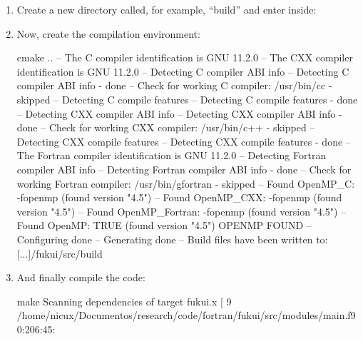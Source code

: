 \documentclass[a4paper,11pt,openany]{memoir}
\begin{document}
\begin{enumerate}
\begin{consola}{vim CMakeLists.txt}
set(CMAKE\_Fortran\_COMPILER gfortran)
#set(CMAKE\_Fortran\_COMPILER ifort)
set(CMAKE\_GENERATOR\_FC gfortran)
#set(CMAKE\_GENERATOR\_FC ifort)
## Comment the line in which ``gfortran'' is set and uncomment the corresponding lines
## using ``ifort'':
## >> DEFAULT COMPILER << \#\# Force compiler you want
#set(CMAKE\_Fortran\_COMPILER gfortran)
set(CMAKE\_Fortran\_COMPILER ifort)
#set(CMAKE\_GENERATOR\_FC gfortran)
set(CMAKE\_GENERATOR\_FC ifort)
\end{consola}
	\item Create a new directory called, for example, ``build'' and enter inside:
	\item Now, create the compilation environment:
		\begin{consola}{cmake ..}
-- The C compiler identification is GNU 11.2.0
-- The CXX compiler identification is GNU 11.2.0
-- Detecting C compiler ABI info
-- Detecting C compiler ABI info - done
-- Check for working C compiler: /usr/bin/cc - skipped
-- Detecting C compile features
-- Detecting C compile features - done
-- Detecting CXX compiler ABI info
-- Detecting CXX compiler ABI info - done
-- Check for working CXX compiler: /usr/bin/c++ - skipped
-- Detecting CXX compile features
-- Detecting CXX compile features - done
-- The Fortran compiler identification is GNU 11.2.0
-- Detecting Fortran compiler ABI info
-- Detecting Fortran compiler ABI info - done
-- Check for working Fortran compiler: /usr/bin/gfortran - skipped
-- Found OpenMP_C: -fopenmp (found version "4.5")
-- Found OpenMP_CXX: -fopenmp (found version "4.5")
-- Found OpenMP_Fortran: -fopenmp (found version "4.5")
-- Found OpenMP: TRUE (found version "4.5")
OPENMP FOUND
-- Configuring done
-- Generating done
-- Build files have been written to: [...]/fukui/src/build
\end{consola}
	\item And finally compile the code:
		\begin{consola}{make}
Scanning dependencies of target fukui.x
[  9%
/home/nicux/Documentos/research/code/fortran/fukui/src/modules/main.f90:206:45:


\end{consola}
\end{enumerate}
\end{document}
